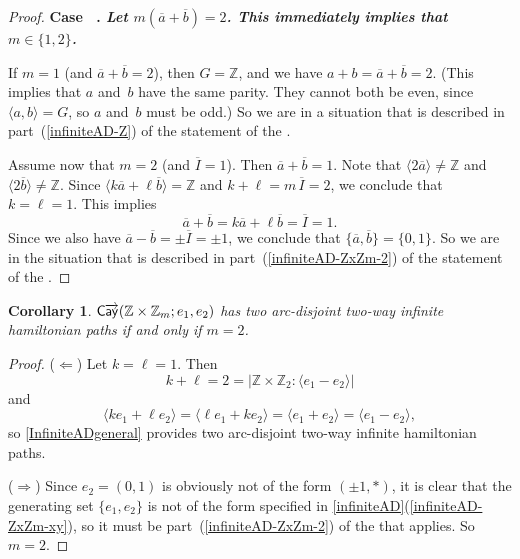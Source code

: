 \documentclass[11pt]{amsart}
\newtheorem{cor}[equation]{Corollary}
\newcommand{\fullcref}[2]{\cref{#1}(\ref{#1-#2})}
\theoremstyle{definition}
\newcounter{case}
\numberwithin{case}{startcases}
\newenvironment{case}[1][\unskip]{\refstepcounter{case}\bf
	\medskip \noindent Case \thecase\ #1. \it}{\unskip\upshape}
\renewcommand{\thecase}{\Roman{case}}
\numberwithin{equation}{section}
\newcommand{\Z}{\mathbb{Z}}  %
\newcommand{\cayd}{\mathop{\mathsf{C}\mkern-1mu\overrightarrow{\mathsf{ay}}}}
\begin{document}
\begin{proof}
		\begin{case}
			Let $m(\overline a + \overline b) = 2$.
		\end{case}
		This immediately implies that $m \in \{1,2\}$. 
		
		If $m = 1$ (and $\overline a + \overline b = 2$), then $G = \Z$, and we have $a + b = \overline a + \overline b = 2$. (This implies that $a$ and~$b$ have the same parity. They cannot both be even, since $\langle a, b \rangle = G$, so $a$ and~$b$ must be odd.) So we are in a situation that is described in part~(\ref{infiniteAD-Z}) of the statement of the . 
		
		Assume now that $m = 2$ (and $\overline I = 1$). Then $\overline a + \overline b = 1$. Note that $\langle 2 \overline a \rangle \neq \Z$ and $\langle 2 \overline b \rangle \neq \Z$. Since $\langle k \overline a + \ell \overline b \rangle = \Z$ and $k + \ell = m \, \overline I = 2$, we conclude that $k = \ell = 1$. This implies 
		\[ \overline a + \overline b = k \overline a + \ell \overline b  = \overline I = 1 . \]
		Since we also have $\overline a - \overline b = \pm \overline I = \pm 1$, we conclude that $\{\overline a, \overline b\} = \{0, 1\}$. So we are in the situation that is described in part~(\ref{infiniteAD-ZxZm-2}) of the statement of the . 
	\end{proof}
	
	\begin{cor} \label{ZmxZ}
		$\cayd(\Z \times \Z_m; e_1, e_2)$ has two arc-disjoint two-way infinite hamiltonian paths if and only if $m = 2$.
	\end{cor}
	
	\begin{proof}
		($\Leftarrow$) Let $k = \ell = 1$. Then 
		\[ k + \ell = 2 = |\Z \times \Z_2 : \langle e_1 - e_2 \rangle| \]
		and
		\[ \langle ke_1 + \ell e_2 \rangle
		= \langle \ell e_1 + k e_2 \rangle
		= \langle e_1 + e_2 \rangle
		= \langle e_1 - e_2 \rangle
		, \]
		so \cref{InfiniteADgeneral} provides two arc-disjoint two-way infinite hamiltonian paths.
		
		($\Rightarrow$) Since $e_2 = (0,1)$ is obviously not of the form $(\pm1, *)$, it is clear that the generating set $\{e_1, e_2\}$ is not of the form specified in \fullcref{infiniteAD}{ZxZm-xy}, so it must be part~(\ref{infiniteAD-ZxZm-2}) of the  that applies. So $m = 2$.
	\end{proof}
	
	
	
	
	
\end{document}
